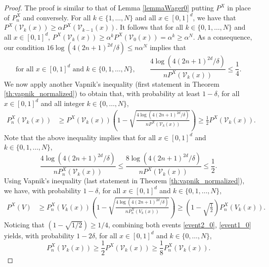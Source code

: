 \documentclass[paper=a4, fontsize=11pt]{scrartcl}
\begin{document}
\begin{proof}
The proof is similar to that of Lemma \ref{lemmaWager0} putting  $P^X$ in place of $P_n^X$ and conversely. For all $k\in \{1,\ldots, N\}$ and all $x\in [0,1]^d$, we have that $P^X(\mathcal V_k(x)) \geq \alpha P ^X(\mathcal{V}_{k-1}(x))$. It follows that for all $k\in \{0,1,\ldots, N\}$ and all $x\in [0,1]^d$, $ P^X(\mathcal V_k(x))  \geq  \alpha^{k} P^X(\mathcal{V}_0(x)) = \alpha^{k}\geq \alpha^N $. As a consequence, our condition $16 \log( 4 (2n+1)^{2d} / \delta) \leq n \alpha^{N}$ implies that 
$$ \text{for all }x\in [0,1]^d \text{ and } k\in \{0,1,\ldots, N\} , \qquad \frac{ 4 \log( 4 (2n+1)^{2d} / \delta) }{ n P^X(\mathcal V_k(x)) } \leq \frac 1  4. $$ 
We now apply another Vapnik's inequality (first statement in Theorem \ref{th:vapnik_normalized}) to obtain that, with probability at least $1 - \delta$, for  all $x\in [0,1]^d$ and all integer $k \in \{0,\dots,N\}$,
\begin{align}\label{event2_0} 
P^X_n(\mathcal{V}_{k}(x))  &\geq P ^X (\mathcal{V}_{k}(x)) \left(1-\sqrt { \frac{4 \log( 4 (2n+1)^{2d} / \delta) }{ nP ^X (\mathcal{V}_{k}(x))  } } \right) \geq  \frac{1}{ 2}    P ^X (\mathcal{V}_{k}(x)).
\end{align}
Note that the above inequality implies that for all $x\in [0,1]^d$ and $k\in \{0,1,\ldots, N \}$,
$$ \frac{ 4 \log( 4 (2n+1)^{2d} / \delta) }{ n P^X_n(\mathcal V_k(x)) } \leq \frac{ 8 \log( 4 (2n+1)^{2d} / \delta) }{ n P^X(\mathcal V_k(x)) }\leq \frac 1  2. $$ 
Using Vapnik's inequality (last statement in Theorem \ref{th:vapnik_normalized}), we have, with probability $1-\delta$, for all $x\in [0,1]^d$ and $k\in \{0,1,\ldots, N \}$,
\begin{align}\label{event1_0}
    P^X(V)   &\geq P_n^X (V_k(x)) \left(1-\sqrt { \frac{4 \log( 4 (2n+1)^{2d}  / \delta) }{ nP_n^X (V_k(x))} } \right)\geq \left(1-\sqrt { \frac{1 }{2} } \right) P_n^X (V_k(x)). 
\end{align}
Noticing that $ (1- \sqrt {1 / 2} ) \geq 1/4$, combining both events \eqref{event2_0}, \eqref{event1_0} yields, with probability $1-2\delta$, for all $x\in [0,1]^d$ and  $k\in \{ 0,\ldots , N\}$,
$$P^X _n (\mathcal{V}_{k}(x))  \geq \frac 1 2  P^X(\mathcal{V}_{k}(x))\geq  \frac{1}{ 8}    P ^X_n (\mathcal{V}_{k}(x)) . $$

\end{proof}
\end{document}
